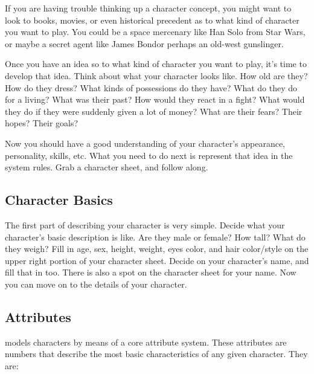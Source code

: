 \documentclass[twoside]{book}
\begin{document}
    {  
     If you are having trouble thinking up a character
             concept, you might want to look to books, movies, or even
             historical precedent as to what kind of character you want
             to play. You could be a space mercenary like Han Solo from
             Star Wars, or maybe a secret agent like James Bondor
             perhaps an old-west gunslinger. 
    }
  
    {  
     Once you have an idea so to what kind of character you
             want to play, it's time to develop that idea. Think
             about what your character looks like. How old are they? How
             do they dress? What kinds of possessions do they have? What
             do they do for a living? What was their past? How would they
             react in a fight? What would they do if they were suddenly
             given a lot of money? What are their fears? Their hopes?
             Their goals? 
    }
  
    {  
     Now you should have a good understanding of your
            character's appearance, personality, skills, etc. What
            you need to do next is represent that idea in the \APATHY{} 
            system rules. Grab a character sheet, and follow along.
          
    }
  
    

\subsection{Character Basics}
    
    {  
     The first part of describing your character is very
               simple. Decide what your character's basic
               description is like. Are they male or female? How tall?
               What do they weigh? Fill in age, sex, height, weight, eyes
               color, and hair color/style on the upper right portion of
               your character sheet. Decide on your character's
               name, and fill that in too. There is also a spot on the
               character sheet for your name. Now you can move on to the
               details of your character. 
    }
  
    

\subsection{Attributes}
    
    {  
    \APATHY{}  models characters by means of a core
              attribute system. These attributes are numbers that
              describe the most basic characteristics of any given
              character. They are:
            
    }
  
\end{document}

